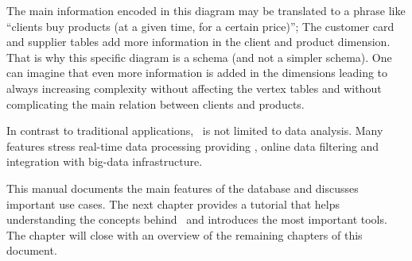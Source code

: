 \begin{minipage}{\textwidth}
\begin{center}
\end{center}
\end{minipage}

The main information encoded in this diagram may be translated
to a phrase like ``clients buy products (at a given time, for a certain price)'';
The customer card and supplier tables add more information
in the client and product dimension. That is why this specific
diagram is a  schema
(and not a simpler  schema).
One can imagine that even more information
is added in the dimensions leading to
always increasing complexity without
affecting the vertex tables and without
complicating the main relation between
clients and products.

In contrast to traditional
 applications,
\nowdb\ is not limited to data analysis.
Many features stress real-time data
processing providing ,
online data filtering and integration with big-data
infrastructure.

This manual documents the main features
of the database and discusses important
use cases. The next chapter provides
a  tutorial that helps
understanding the concepts behind \nowdb\
and introduces the most important tools.
The chapter will close
with an overview of the remaining
chapters of this document.



